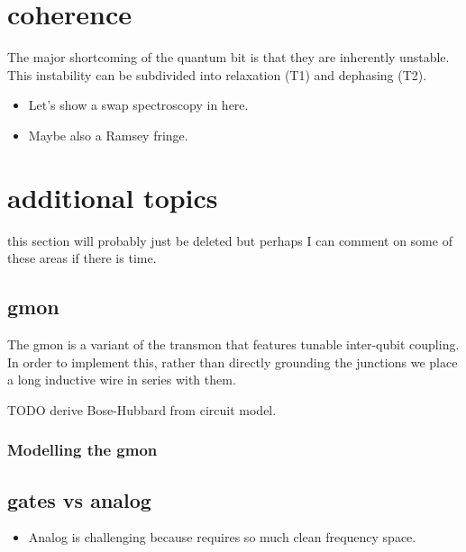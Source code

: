 {\section{coherence}
The major shortcoming of the quantum bit is that they are inherently unstable.
This instability can be subdivided into relaxation (T1) and dephasing (T2).
\begin{itemize}
    \item Let's show a swap spectroscopy in here.
    \item Maybe also a Ramsey fringe.
\end{itemize}

\section{additional topics}
this section will probably just be deleted but perhaps I can comment on some of these areas if there is time.

\subsection{gmon}
The gmon is a variant of the transmon that features tunable inter-qubit coupling.
In order to implement this, rather than directly grounding the junctions we place a long inductive wire in series with them.

TODO derive Bose-Hubbard from circuit model.
\subsubsection{Modelling the gmon}

\subsection{gates vs analog}

\begin{itemize}
    \item Analog is challenging because requires so much clean frequency space.
\end{itemize}

}%
